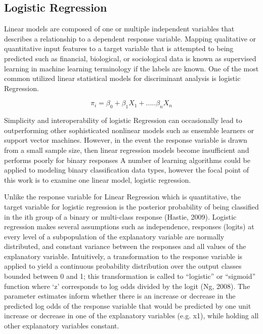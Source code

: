 \documentclass{llncs}
\begin{document}
\subsection{Logistic Regression}


Linear models are composed of one or multiple independent variables that describes a relationship to a dependent response variable. Mapping qualitative or quantitative input features to a target variable that is attempted to being predicted such as financial, biological, or sociological data is known as supervised learning in machine learning terminology if the labels are known.  One of the most common utilized linear statistical models for discriminant analysis is logistic Regression.

\begin{equation}
\pi_{i} = \beta_{0} + \beta_{1}X_{1} + .....\beta_{n}X_{n}
\end{equation}

Simplicity and interoperability of logistic Regression can occasionally lead to outperforming other sophisticated nonlinear models such as ensemble learners or support vector machines. However, in the event the response variable is drawn from a small sample size, then linear regression models become insufficient and performs poorly for binary responses A number of learning algorithms could be applied to modeling binary classification data types, however the focal point of this work is to examine one linear model, logistic regression. 
 
Unlike the response variable for Linear Regression which is quantitative, the target variable for logistic regression is the posterior probability of being classified in the ith group of a binary or multi-class response (Hastie, 2009). Logistic regression makes several assumptions such as independence, responses (logits) at every level of a subpopulation of the explanatory variable are normally distributed, and constant variance between the responses and all values of the explanatory variable. Intuitively, a transformation to the response variable is applied to yield a continuous probability distribution over the output classes bounded between 0 and 1; this transformation is called to “logistic” or “sigmoid” function where ‘z’ corresponds to log odds divided by the logit (Ng, 2008). The parameter estimates inform whether there is an increase or decrease in the predicted log odds of the response variable that would be predicted by one unit increase or decrease in one of the explanatory variables (e.g. x1), while holding all other explanatory variables constant.
\end{document}
